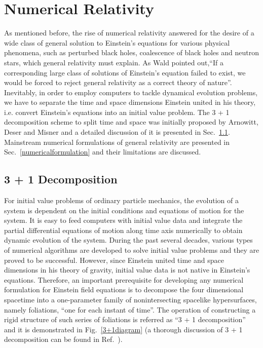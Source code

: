 \chapter{Numerical Relativity}\label{nr}
As mentioned before, the rise of numerical relativity answered for the desire of a wide class of general solution to Einstein's equations for various physical phenomena, such as perturbed black holes, coalescence of black holes and neutron stars, which general relativity must explain. As Wald pointed out,``If a corresponding large class of solutions of Einstein's equation failed to exist, we would be forced to reject general relativity as a correct theory of nature''\cite{Wald:GRbook}. Inevitably, in order to employ computers to tackle dynamical evolution problems, we have to separate the time and space dimensions Einstein united in his theory, i.e. convert Einstein's equations into an initial value problem. The 3 + 1 decomposition scheme to split time and space was initially proposed by Arnowitt, Deser and Misner\cite{ADM:Witten} and a detailed discussion of it is presented in Sec.~\ref{3+1}. Mainstream numerical formulations of general relativity are presented in Sec.~\ref{numericalformulation} and their limitations are discussed. 
\section{3 + 1 Decomposition}\label{3+1}
For initial value problems of ordinary particle mechanics, the evolution of a system is dependent on the initial conditions and equations of motion for the system. It is easy to feed computers with initial value data and integrate the partial differential equations of motion along time axis numerically to obtain dynamic evolution of the system. During the past several decades, various types of numerical algorithms are developed to solve initial value problems and they are proved to be successful. However, since Einstein united time and space dimensions in his theory of gravity, initial value data is not native in Einstein's equations. Therefore, an important prerequisite for developing any numerical formulation for Einstein field equations is to decompose the four dimensional spacetime into a one-parameter family of nonintersecting spacelike hypersurfaces, namely foliations, ``one for each instant of time''. The operation of constructing a rigid structure of such series of foliations is referred as ``3 + 1 decomposition'' and it is demonstrated in Fig.~\ref{3+1diagram} (a thorough discussion of 3 + 1 decomposition can be found in Ref.~\cite{Gourgoulhon:2007ue}). 

